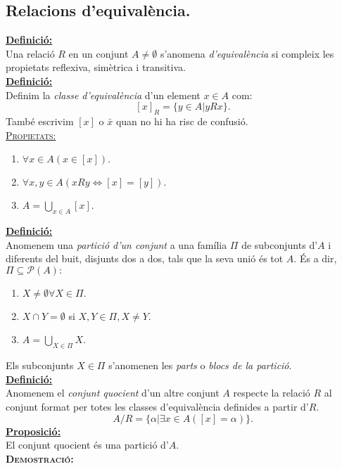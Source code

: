 \documentclass[11pt]{article}
\newcommand{\propietats}{\underline{{\scshape Propietats:}}}
\newcommand{\definicio}{\underline{\textbf{Definició:}}\\}
\newcommand{\proposicio}{\underline{\textbf{Proposició:}}\\}
\newcommand{\demostracio}{\textbf{{\scshape Demostració:}}\\}
\begin{document}
\subsection{Relacions d'equivalència.}
\definicio Una relació $R$ en un conjunt $A\neq\emptyset$ s'anomena \textit{d'equivalència} si compleix les propietats reflexiva, simètrica i transitiva.\\
\definicio Definim la \textit{classe d'equivalència} d'un element $x\in A$ com:$$[x]_R=\{y\in A|yRx\}.$$També escrivim $[x]$ o $\bar{x}$ quan no hi ha risc de confusió.\\
\propietats \begin{enumerate}
	\item $\forall x\in A(x\in [x]).$
	\item $\forall x,y\in A (xRy\iff [x]=[y]).$
	\item $A=\bigcup_{x\in A}[x].$
\end{enumerate}
\definicio Anomenem una \textit{partició d'un conjunt} a una família $\Pi$ de subconjunts d'$A$ i diferents del buit, disjunts dos a dos, tals que la seva unió és tot $A$. És a dir, $\Pi\subseteq\mathcal{P}(A):$
\begin{enumerate}
	\item $X\neq\emptyset\forall X\in\Pi.$
	\item $X\cap Y = \emptyset$ si $X,Y\in\Pi,X\neq Y.$
	\item $A=\bigcup_{X\in\Pi}X.$
\end{enumerate}
Els subconjunts $X\in\Pi$ s'anomenen les \textit{parts} o \textit{blocs de la partició}.\\
\definicio Anomenem el \textit{conjunt quocient} d'un altre conjunt $A$ respecte la relació $R$ al conjunt format per totes les classes d'equivalència definides a partir d'$R$.$$A/R=\{\alpha|\exists x\in A([x]=\alpha)\}.$$
\proposicio El conjunt quocient és una partició d'$A$.\\
\demostracio 
\end{document}
